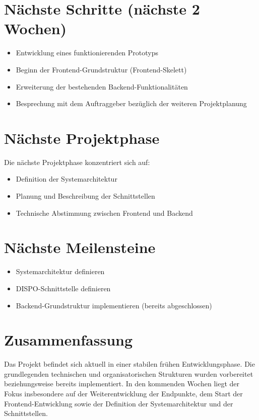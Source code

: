 \documentclass[a4paper,11pt]{article}
\begin{document}
\vspace{0.5cm}

\section{Nächste Schritte (nächste 2 Wochen)}

\begin{itemize}[leftmargin=1.2cm]
    \item Entwicklung eines funktionierenden Prototyps
    \item Beginn der Frontend-Grundstruktur (Frontend-Skelett)
    \item Erweiterung der bestehenden Backend-Funktionalitäten
    \item Besprechung mit dem Auftraggeber bezüglich der weiteren Projektplanung
\end{itemize}


\vspace{0.5cm}

\section{Nächste Projektphase}

Die nächste Projektphase konzentriert sich auf:

\begin{itemize}[leftmargin=1.2cm]
    \item Definition der Systemarchitektur
    \item Planung und Beschreibung der Schnittstellen
    \item Technische Abstimmung zwischen Frontend und Backend
\end{itemize}

\vspace{0.5cm}

\section{Nächste Meilensteine}

\begin{itemize}[leftmargin=1.2cm]
    \item Systemarchitektur definieren
    \item DISPO-Schnittstelle definieren
    \item Backend-Grundstruktur implementieren (bereits abgeschlossen)
\end{itemize}

\vspace{1cm}

\section{Zusammenfassung}

Das Projekt befindet sich aktuell in einer stabilen frühen Entwicklungsphase. 
Die grundlegenden technischen und organisatorischen Strukturen wurden vorbereitet beziehungsweise bereits implementiert. 
In den kommenden Wochen liegt der Fokus insbesondere auf der Weiterentwicklung der Endpunkte, dem Start der Frontend-Entwicklung sowie der Definition der Systemarchitektur und der Schnittstellen.
\end{document}
